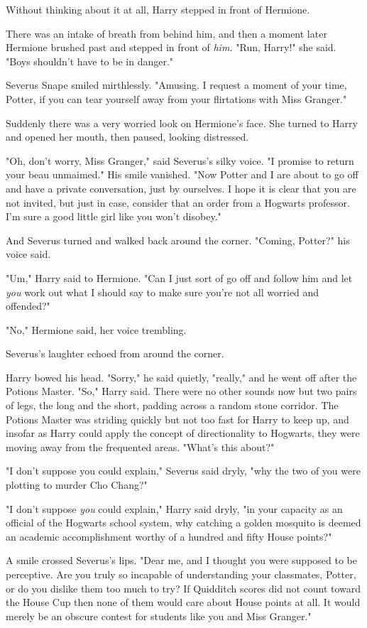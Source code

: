 Without thinking about it at all, Harry stepped in front of Hermione.

There was an intake of breath from behind him, and then a moment later Hermione
brushed past and stepped in front of \emph{him.} "Run, Harry!" she said. "Boys
shouldn't have to be in danger."

Severus Snape smiled mirthlessly. "Amusing. I request a moment of your time,
Potter, if you can tear yourself away from your flirtations with Miss Granger."

Suddenly there was a very worried look on Hermione's face. She turned to Harry
and opened her mouth, then paused, looking distressed.

"Oh, don't worry, Miss Granger," said Severus's silky voice. "I promise to
return your beau unmaimed." His smile vanished. "Now Potter and I are about to
go off and have a private conversation, just by ourselves. I hope it is clear
that you are not invited, but just in case, consider that an order from a
Hogwarts professor. I'm sure a good little girl like you won't disobey."

And Severus turned and walked back around the corner. "Coming, Potter?" his
voice said.

"Um," Harry said to Hermione. "Can I just sort of go off and follow him and let
\emph{you} work out what I should say to make sure you're not all worried and
offended?"

"No," Hermione said, her voice trembling.

Severus's laughter echoed from around the corner.

Harry bowed his head. "Sorry," he said quietly, "really," and he went off after
the Potions Master.
\later
"So," Harry said. There were no other sounds now but two pairs of legs, the
long and the short, padding across a random stone corridor. The Potions Master
was striding quickly but not too fast for Harry to keep up, and insofar as
Harry could apply the concept of directionality to Hogwarts, they were moving
away from the frequented areas. "What's this about?"

"I don't suppose you could explain," Severus said dryly, "why the two of you
were plotting to murder Cho Chang?"

"I don't suppose \emph{you} could explain," Harry said dryly, "in your capacity
as an official of the Hogwarts school system, why catching a golden mosquito is
deemed an academic accomplishment worthy of a hundred and fifty House points?"

A smile crossed Severus's lips. "Dear me, and I thought you were supposed to be
perceptive. Are you truly so incapable of understanding your classmates,
Potter, or do you dislike them too much to try? If Quidditch scores did not
count toward the House Cup then none of them would care about House points at
all. It would merely be an obscure contest for students like you and Miss
Granger."

